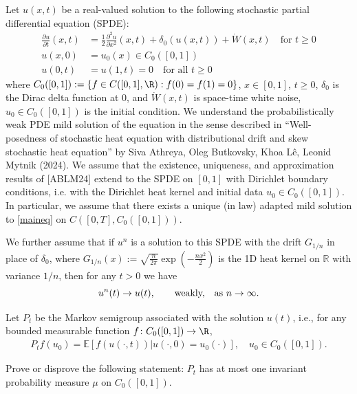 Let $u(x,t)$ be  a real-valued  solution to the following stochastic partial differential equation (SPDE):
\begin{align}\tag{$*$}\label{maineq}
    \frac{\partial u}{\partial t}(x,t) &= \frac{1}{2} \frac{\partial^2 u}{\partial x^2}(x,t) + \delta_0(u(x,t)) +  \dot{W}(x,t) \quad\text{for }t \geq 0\\
    u(x,0) &= u_0(x)\in C_0([0,1])\nonumber\\
    u(0,t) &= u(1,t)=0\quad\text{for all }t\geq0    \nonumber
\end{align}
where $C_0([0,1]):=\{f\in C([0,1],\R): f(0)=f(1)=0\}$, $x \in [0,1]$, $t \geq 0$, $\delta_0$ is the Dirac delta
function at $0$, and $\dot{W}(x,t)$ is space-time white noise, $u_0\in C_0([0,1])$ is the initial condition. We understand
the probabilistically weak PDE mild solution of the equation in the
sense described in ``Well-posedness of stochastic heat equation with
distributional drift and skew stochastic heat equation'' by Siva
Athreya, Oleg Butkovsky, Khoa Lê, Leonid Mytnik (2024). 
We assume that the existence, uniqueness, and approximation results of [ABLM24] extend to the SPDE on $[0,1]$ with Dirichlet boundary conditions, i.e. with the Dirichlet heat kernel and initial data $u_0\in C_0([0,1])$. In
particular, we assume that there exists a unique (in law) adapted mild solution to \eqref{maineq} on $C([0,T],C_0([0,1]))$.


We further assume that if $u^n$ is a solution to this SPDE with the drift $G_{1/n}$ in place of $\delta_0$, where $G_{1/n}(x):=\sqrt{\frac{n}{2\pi}} \exp(-\frac{n x^2}{2})$ is the 1D heat kernel on $\mathbb{R}$ with variance $1/n$, then for any $t>0$ we have 
\begin{equation*}
u^n(t)\to u(t),\qquad\text{weakly, \,\, as $n\to\infty$}.
\end{equation*}

Let $P_t$ be the Markov semigroup associated with the solution $u(t)$, i.e., for any bounded measurable function $f\colon C_0([0,1])\to\R$,
\begin{align}
    P_t f(u_0) = \mathbb{E}[f(u(\cdot,t)) | u(\cdot,0) = u_0(\cdot)],\quad u_0\in C_0([0,1]).
\end{align}


Prove or disprove the following statement:  $P_t$ has at most one invariant probability measure $\mu$ on $C_0([0,1])$.